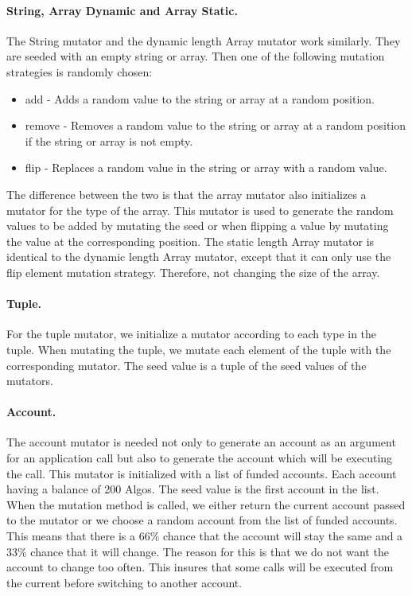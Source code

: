 \paragraph{String, Array Dynamic and Array Static.}
The String mutator and the dynamic length Array mutator work similarly. They are seeded with an empty string or array. Then one of the following mutation strategies is randomly chosen:
\begin{itemize}
    \item add - Adds a random value to the string or array at a random position.
    \item remove - Removes a random value to the string or array at a random position if the string or array is not empty.
    \item flip - Replaces a random value in the string or array with a random value.
\end{itemize}

The difference between the two is that the array mutator also initializes a mutator for the type of the array.
This mutator is used to generate the random values to be added by mutating the seed or when flipping a value by mutating the value at the corresponding position.
The static length Array mutator is identical to the dynamic length Array mutator, except that it can only use the flip element mutation strategy.
Therefore, not changing the size of the array.

\paragraph{Tuple.}
For the tuple mutator, we initialize a mutator according to each type in the tuple.
When mutating the tuple, we mutate each element of the tuple with the corresponding mutator.
The seed value is a tuple of the seed values of the mutators.

\paragraph{Account.}
The account mutator is needed not only to generate an account as an argument for an application call but also to generate the account which will be executing the call.
This mutator is initialized with a list of funded accounts.
Each account having a balance of 200 Algos.
The seed value is the first account in the list.
When the mutation method is called, we either return the current account passed to the mutator or we choose a random account from the list of funded accounts.
This means that there is a 66\% chance that the account will stay the same and a 33\% chance that it will change.
The reason for this is that we do not want the account to change too often.
This insures that some calls will be executed from the current before switching to another account.

